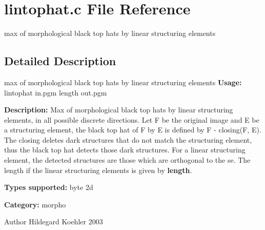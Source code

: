 \section{lintophat.c File Reference}
\label{lintophat_8c}


max of morphological black top hats by linear structuring elements  




\subsection{Detailed Description}
max of morphological black top hats by linear structuring elements {\bfseries Usage:} lintophat in.pgm length out.pgm

{\bfseries Description:} Max of morphological black top hats by linear structuring elements, in all possible discrete directions. Let F be the original image and E be a structuring element, the black top hat of F by E is defined by F -\/ closing(F, E). The closing deletes dark structures that do not match the structuring element, thus the black top hat detects those dark structures. For a linear structuring element, the detected structures are those which are orthogonal to the se. The length if the linear structuring elements is given by {\bfseries length}.

{\bfseries Types supported:} byte 2d

{\bfseries Category:} morpho

\begin{DoxyAuthor}{Author}
Hildegard Koehler 2003 
\end{DoxyAuthor}
